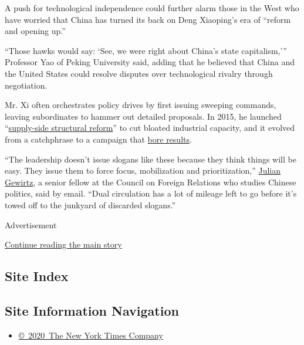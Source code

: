 A push for technological independence could further alarm those in the
West who have worried that China has turned its back on Deng Xiaoping's
era of ``reform and opening up.''

``Those hawks would say: `See, we were right about China's state
capitalism,''' Professor Yao of Peking University said, adding that he
believed that China and the United States could resolve disputes over
technological rivalry through negotiation.

Mr. Xi often orchestrates policy drives by first issuing sweeping
commands, leaving subordinates to hammer out detailed proposals. In
2015, he launched
``\href{https://www.nytimes3xbfgragh.onion/2016/03/04/world/asia/xi-jinping-china-economic-policy.html}{supply-side
structural reform}'' to cut bloated industrial capacity, and it evolved
from a catchphrase to a campaign that
\href{https://www.rba.gov.au/publications/bulletin/2018/dec/chinas-supply-side-structural-reform.html}{bore
results}.

``The leadership doesn't issue slogans like these because they think
things will be easy. They issue them to force focus, mobilization and
prioritization,''
\href{https://www.cfr.org/expert/julian-gewirtz}{Julian Gewirtz}, a
senior fellow at the Council on Foreign Relations who studies Chinese
politics, said by email. ``Dual circulation has a lot of mileage left to
go before it's towed off to the junkyard of discarded slogans.''

Advertisement

\protect\hyperlink{after-bottom}{Continue reading the main story}

\hypertarget{site-index}{%
\subsection{Site Index}\label{site-index}}

\hypertarget{site-information-navigation}{%
\subsection{Site Information
Navigation}\label{site-information-navigation}}

\begin{itemize}
\tightlist
\item
  \href{https://help.nytimes3xbfgragh.onion/hc/en-us/articles/115014792127-Copyright-notice}{©~2020~The
  New York Times Company}
\end{itemize}

